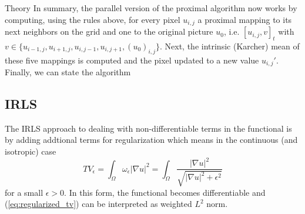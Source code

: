 \begin{chapter}{Theory}
In summary, the parallel version of the proximal algorithm now works by computing, using the rules above, for every pixel $u_{i,j}$ a proximal mapping to its next neighbors on the grid and one
to the original picture $u_0$, i.e. $[u_{i,j}, v]_t$ with $v\in\lbrace u_{i-1,j},u_{i+1,j},u_{i,j-1}, u_{i,j+1}, (u_0)_{i,j}\rbrace$. Next, the intrinsic (Karcher) mean \cite{Karcher} of 
these five mappings is computed and the pixel updated to a new value $u_{i,j}'$.\\

Finally, we can state the algorithm




\subsection{IRLS} %
\label{sub:IRLS}
The IRLS approach to dealing with non-differentiable terms in the functional is by adding addtional terms for regularization which means in the continuous (and isotropic) case 
\begin{equation}
    \label{eq:regulzarized_tv}
    TV_{\epsilon}=\int_{\Omega}\omega_{\epsilon}|\nabla u|^2 =\int_{\Omega}\frac{|\nabla u|^2}{\sqrt{|\nabla u|^2+\epsilon^2}}
\end{equation}
for a small $\epsilon>0$. In this form, the functional becomes differentiable and (\ref{eq:regularized_tv}) can be interpreted as weighted $L^2$ norm.


\end{chapter}
